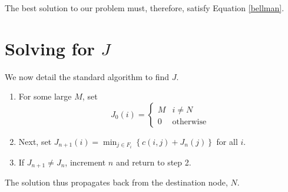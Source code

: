 \documentclass[a4paper,12pt]{scrartcl}
\begin{document}
The best solution to our problem must, therefore, satisfy Equation
\ref{bellman}.

\section{Solving for $J$}

We now detail the standard algorithm to find $J$.
\begin{enumerate}
    \item For some large $M$, set
	\begin{equation}
	    J_0(i) = \begin{cases} M & i \neq N \\ 
				    0 & \text{otherwise}
		    \end{cases}
	\end{equation}

    \item Next, set 
	$J_{n+1}(i) = \min_{j \in F_i} \left\{ c(i,j) + J_n(j)\right\}$
	for all $i$.

    \item If $J_{n+1} \neq J_n$, increment $n$ and return to step 2.

\end{enumerate}
The solution thus propagates back from the destination node, $N$.






% 
\end{document}
